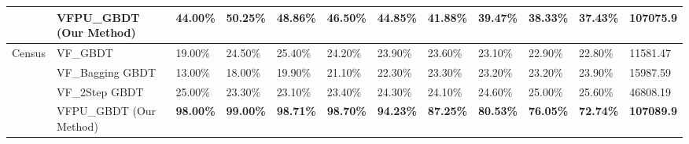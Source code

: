 \begin{table}[h]
{{\begin{tabular}{llllllllllll}
				& VFPU\_GBDT (Our Method) & \textbf{44.00\%} & \textbf{50.25\%} & \textbf{48.86\%} & \textbf{46.50\%} & \textbf{44.85\%} & \textbf{41.88\%} & \textbf{39.47\%} & \textbf{38.33\%} & \textbf{37.43\%} & \textbf{107075.9}  \\ 
				\hline
				\multirow{4}{*}{Census} & VF\_GBDT                & 19.00\%          & 24.50\%          & 25.40\%          & 24.20\%          & 23.90\%          & 23.60\%          & 23.10\%          & 22.90\%          & 22.80\%          & 11581.47           \\
				& VF\_Bagging GBDT        & 13.00\%          & 18.00\%          & 19.90\%          & 21.10\%          & 22.30\%          & 23.30\%          & 23.20\%          & 23.20\%          & 23.90\%          & 15987.59           \\
				& VF\_2Step GBDT          & 25.00\%          & 23.30\%          & 23.10\%          & 23.40\%          & 24.30\%          & 24.10\%          & 24.60\%          & 25.00\%          & 25.60\%          & 46808.19           \\
				& VFPU\_GBDT (Our Method) & \textbf{98.00\%} & \textbf{99.00\%} & \textbf{98.71\%} & \textbf{98.70\%} & \textbf{94.23\%} & \textbf{87.25\%} & \textbf{80.53\%} & \textbf{76.05\%} & \textbf{72.74\%} & \textbf{107089.9}  \\
				\hline
			\end{tabular}
		}
	}
\end{table}
\vspace{-0.1cm}